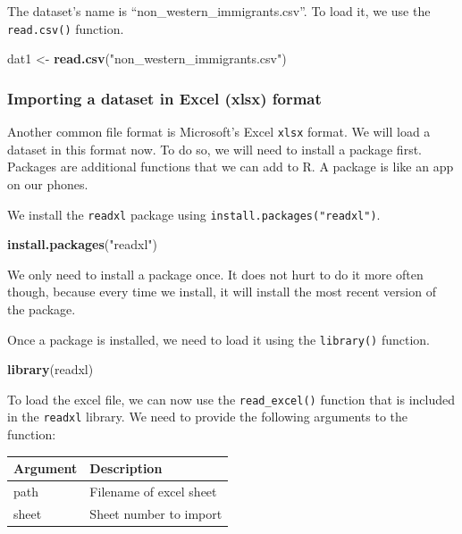 \documentclass[]{article}
\newenvironment{Shaded}{\begin{snugshade}}{\end{snugshade}}
\newcommand{\KeywordTok}[1]{\textcolor[rgb]{0.13,0.29,0.53}{\textbf{#1}}}
\newcommand{\NormalTok}[1]{#1}
\newcommand{\StringTok}[1]{\textcolor[rgb]{0.31,0.60,0.02}{#1}}
\begin{document}
The dataset's name is ``non\_western\_immigrants.csv''. To load it, we use the \texttt{read.csv()} function.

\begin{Shaded}
\begin{Highlighting}[]
\NormalTok{dat1 <-}\StringTok{ }\KeywordTok{read.csv}\NormalTok{(}\StringTok{"non_western_immigrants.csv"}\NormalTok{)}
\end{Highlighting}
\end{Shaded}

\hypertarget{importing-a-dataset-in-excel-xlsx-format}{%
\subsubsection{Importing a dataset in Excel (xlsx) format}\label{importing-a-dataset-in-excel-xlsx-format}}

Another common file format is Microsoft's Excel \texttt{xlsx} format. We will load a dataset in this format now. To do so, we will need to install a package first. Packages are additional functions that we can add to R. A package is like an app on our phones.

We install the \texttt{readxl} package using \texttt{install.packages("readxl")}.

\begin{Shaded}
\begin{Highlighting}[]
\KeywordTok{install.packages}\NormalTok{(}\StringTok{"readxl"}\NormalTok{)}
\end{Highlighting}
\end{Shaded}

We only need to install a package once. It does not hurt to do it more often though, because every time we install, it will install the most recent version of the package.

Once a package is installed, we need to load it using the \texttt{library()} function.

\begin{Shaded}
\begin{Highlighting}[]
\KeywordTok{library}\NormalTok{(readxl)}
\end{Highlighting}
\end{Shaded}

To load the excel file, we can now use the \texttt{read\_excel()} function that is included in the \texttt{readxl} library. We need to provide the following arguments to the function:

\begin{longtable}[]{@{}ll@{}}
\toprule
Argument & Description\tabularnewline
\midrule
\endhead
path & Filename of excel sheet\tabularnewline
sheet & Sheet number to import\tabularnewline
\bottomrule
\end{longtable}
\end{document}
